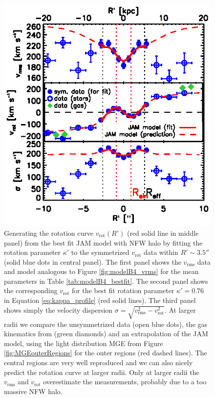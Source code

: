 \documentclass[useAMS,usenatbib]{mnras}
\begin{document}
\begin{figure}
\centering
\includegraphics[width=\linewidth]{fig/B4_rms_rot_curves_best_model.ps}
\caption{Generating the rotation curve $v_\text{rot}(R')$ (red solid line in middle panel) from the best fit JAM model with NFW halo by fitting the rotation parameter $\kappa'$ to the symmetrized $v_\text{rot}$ data within $R'\sim3.5''$ (solid blue dots in central panel). The first panel shows the $v_\text{rms}$ data and model analogous to Figure \ref{fig:modelB4_vrms} for the mean parameters in Table \ref{tab:modelB4_bestfit}. The second panel shows the corresponding $v_\text{rot}$ for the best fit rotation parameter $\kappa' = 0.76$ in Equation \eqref{eq:kappa_profile} (red solid lines). The third panel shows simply the velocity dispersion $\sigma = \sqrt{v_\text{rms}^2 - v_\text{rot}^2}$. At larger radii we compare the unsymmetrized data (open blue dots), the gas kinematics from \citet{SWELLSV} (green diamonds) and an extrapolation of the JAM model, using the light distribution MGE from Figure \ref{fig:MGEouterRegions} for the outer regions (red dashed lines). The central regions are very well reproduced and we can also nicely predict the rotation curve at larger radii. Only at larger radii the $v_\text{rms}$ and $v_\text{rot}$ overestimate the measurements, probably due to a too massive NFW halo.}
\label{fig:modelB4_vrot}
\end{figure}
\end{document}
